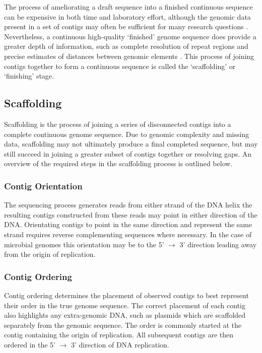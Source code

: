 \documentclass[10pt]{bmc_article}
\newenvironment{bmcformat}{\begin{raggedright}\baselineskip20pt\sloppy\setboolean{publ}{false}}{\end{raggedright}\baselineskip20pt\sloppy}
\begin{document}
\begin{bmcformat}
The process of ameliorating a draft sequence into a finished continuous
sequence can be expensive in both time and laboratory effort, although the
genomic data present in a set of contigs may often be sufficient for many
research questions \cite{branscomb2002}. Nevertheless, a continuous
high-quality `finished' genome sequence does provide a greater depth of
information, such as complete resolution of repeat regions and precise
estimates of distances between genomic elements \cite{parkhill2002,fraser2002}.
This process of joining contigs together to form a continuous sequence is
called the `scaffolding' or `finishing' stage. \pb

\subsection*{Scaffolding} %

Scaffolding is the process of joining a series of disconnected contigs into
a complete continuous genome sequence. Due to genomic complexity and missing
data, scaffolding may not ultimately produce a final completed sequence, but
may still succeed in joining a greater subset of contigs together or resolving
gaps. An overview of the required steps in the scaffolding process is outlined
below.

\subsubsection*{Contig Orientation} %

The sequencing process generates reads from either strand of the DNA helix the
resulting contigs constructed from these reads may point in either direction of
the DNA. Orientating contigs to point in the same direction and represent the
same strand requires reverse complementing sequences where necessary. In the
case of microbial genomes this orientation may be to the 5' $\rightarrow$ 3'
direction leading away from the origin of replication.

\subsubsection*{Contig Ordering} %

Contig ordering determines the placement of observed contigs to best represent
their order in the true genome sequence. The correct placement of each contig
also highlights any extra-genomic DNA, such as plasmids which are scaffolded
separately from the genomic sequence. The order is commonly started at the
contig containing the origin of replication. All subsequent contigs are then
ordered in the 5' $\rightarrow$ 3' direction of DNA replication.


\end{bmcformat}
\end{document}
